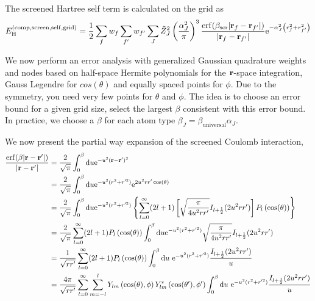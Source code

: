\documentclass[paper=a4, fontsize=11pt]{article} %
\numberwithin{equation}{section} %
\numberwithin{figure}{section} %
\numberwithin{table}{section} %
\newcommand{\br}{{\bf{r}}}
\newcommand{\re}{{\mathrm{e}}}
\newcommand{\rerf}{{\mathrm{erf}}}
\newcommand{\rd}{{\mathrm{d}}}
\newcommand{\rH}{{\mathrm{H}}}
\newcommand{\rcomp}{{\mathrm{comp}}}
\newcommand{\al}{{\alpha}}
\begin{document}
The screened Hartree self term is calculated on the grid as
\begin{equation}
\begin{split}
E_{\rH}^{(\rcomp,\mathrm{screen, self, grid})}
&= \frac{1}{2}\sum_f w_f \sum_{f'} w_{f'} \sum_J \tilde Z_J^2 \left(\frac{\al_J^2}{\pi}\right)^3 \frac{\rerf(\beta_{\mathrm{scr}}|\br_f - \br_{f'}|)}{|\br_f-\br_{f'}|}\re^{-\al_J^2 \left(r_f^2+r_{f'}^2\right)}\\
\end{split}
\end{equation}


We now perform an error analysis with generalized Gaussian quadrature weights and nodes based on half-space Hermite polynomials for the $\br$-space integration, Gauss Legendre for $cos(\theta)$ and equally spaced points for $\phi$. Due to the symmetry, you need very few points for $\theta$ and $\phi$. The idea is to choose an error bound for a given grid size, select the largest $\beta$ consistent with this error bound. In practice, we choose a $\beta$ for each atom type $\beta_{J} = \beta_{\mathrm{universal}} \alpha_{J}$.

We now present the partial way expansion of the screened Coulomb interaction,
\begin{equation}
\begin{split}
\frac{\rerf(\beta|\br-\br'|)}{|\br-\br'|}
&= \frac{2}{\sqrt{\pi}}\int_0^\beta \rd u \re^{-u^2(\br-\br')^2}\\
&= \frac{2}{\sqrt{\pi}}\int_0^\beta \rd u \re^{-u^2(r^2 + r'^2)}\re^{2u^2 r r' \cos(\theta)} \\
&= \frac{2}{\sqrt{\pi}}\int_0^\beta \rd u \re^{-u^2(r^2 + r'^2)} \left\{\sum_{l=0}^\infty (2l+1)\left[\sqrt{\frac{\pi}{4u^2 r r'}}I_{l+\frac{1}{2}}(2u^2 r r')\right]P_l\left(\cos(\theta)\right)\right\} \\
&= \frac{2}{\sqrt{\pi}}\sum_{l=0}^\infty (2l+1)P_l\left(\cos(\theta)\right) \int_0^\beta \rd u \re^{-u^2(r^2 + r'^2)} \sqrt{\frac{\pi}{4u^2 r r'}}I_{l+\frac{1}{2}}(2u^2 r r')\\
&= \frac{1}{\sqrt{r r'}} \sum_{l=0}^\infty (2l+1)P_l\left(\cos(\theta)\right) \int_0^\beta \rd u\ \re^{-u^2(r^2 + r'^2)} \frac{I_{l+\frac{1}{2}}(2u^2 r r')}{u}\\
&= \frac{4\pi}{\sqrt{r r'}} \sum_{l=0}^\infty \sum_{m=-l}^{l} Y_{lm}\left(\cos(\theta),\phi\right)Y_{lm}^*\left(\cos(\theta'),\phi'\right) \int_0^\beta \rd u\ \re^{-u^2(r^2 + r'^2)} \frac{I_{l+\frac{1}{2}}(2u^2 r r')}{u}\\
\end{split}
\end{equation}
\end{document}
